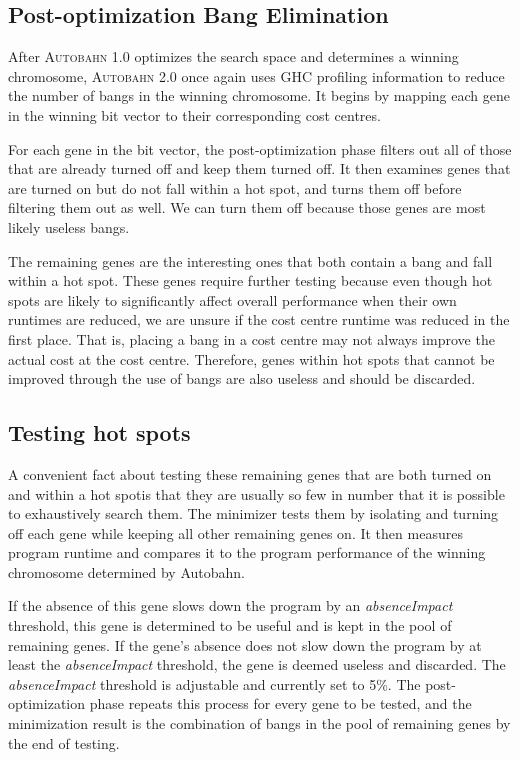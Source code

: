\documentclass[format=sigplan]{acmart}
\newcommand{\hotspot}[0]{hot spot}
\newcommand{\hotspots}[0]{hot spots}
\newcommand{\useless}[0]{useless}
\newcommand{\Ao}[0]{\textsc{Autobahn 1.0}}
\newcommand{\At}[0]{\textsc{Autobahn 2.0}}
\newcommand{\postopt}[0]{post-optimization}
\newcommand{\Postopt}[0]{Post-optimization}
\newcommand{\absim}[0]{\textit{absenceImpact}}
\begin{document}
\subsection{\Postopt{} Bang Elimination}

After \Ao{} optimizes the search space and determines a winning chromosome, \At{} once again uses GHC profiling information to reduce the number of bangs in the winning chromosome. It begins by mapping each gene in the winning bit vector to their corresponding cost centres. 

For each gene in the bit vector, the \postopt{} phase filters out all of those that are already turned off and keep them turned off. It then examines genes that are turned on but do not fall within a \hotspot{}, and turns them off before filtering them out as well. We can turn them off because those genes are most likely \useless{} bangs. 

The remaining genes are the interesting ones that both contain a bang and fall within a \hotspot{}. These genes require further testing because even though \hotspots{} are likely to significantly affect overall performance when their own runtimes are reduced, we are unsure if the cost centre runtime was reduced in the first place. That is, placing a bang in a cost centre may not always improve the actual cost at the cost centre. Therefore, genes within \hotspots{} that cannot be improved through the use of bangs are also \useless{} and should be discarded.

\subsection{Testing \hotspots{}}
 
A convenient fact about testing these remaining genes that are both turned on and within a \hotspot is that they are usually so few in number that it is possible to exhaustively search them. The minimizer tests them by isolating and turning off each gene while keeping all other remaining genes on. It then measures program runtime and compares it to the program performance of the winning chromosome determined by Autobahn. 

If the absence of this gene slows down the program by an \absim{} threshold, this gene is determined to be useful and is kept in the pool of remaining genes. If the gene's absence does not slow down the program by at least the \absim{} threshold, the gene is deemed \useless{} and discarded. The \absim{} threshold is adjustable and currently set to 5\%. The \postopt{} phase repeats this process for every gene to be tested, and the minimization result is the combination of bangs in the pool of remaining genes by the end of testing.
\end{document}
